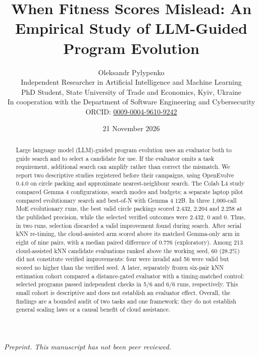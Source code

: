 \documentclass[11pt]{article}
\begin{document}
\title{When Fitness Scores Mislead: An Empirical Study of LLM-Guided Program Evolution}
\author{Oleksandr Pylypenko\\[2pt]\small Independent Researcher in Artificial Intelligence and Machine Learning\\
\small PhD Student, State University of Trade and Economics, Kyiv, Ukraine\\
\small In cooperation with the Department of Software Engineering and Cybersecurity\\[2pt]
\small ORCID: \href{https://orcid.org/0009-0004-9610-9242}{0009-0004-9610-9242}}
\date{21 November 2026}
\maketitle

\begin{center}\small\textit{Preprint. This manuscript has not been peer reviewed.}\end{center}

\begin{abstract}
Large language model (LLM)-guided program evolution uses an evaluator both to guide search and to select a candidate for use. If the evaluator omits a task requirement, additional search can amplify rather than correct the mismatch. We report two descriptive studies registered before their campaigns, using OpenEvolve 0.4.0 on circle packing and approximate nearest-neighbour search. The Colab L4 study compared Gemma 4 configurations, search modes and budgets; a separate laptop pilot compared evolutionary search and best-of-N with Gemma 4 12B. In three 1,000-call MoE evolutionary runs, the best valid circle packings scored 2.432, 2.204 and 2.258 at the published precision, while the selected verified outcomes were 2.432, 0 and 0. Thus, in two runs, selection discarded a valid improvement found during search. After serial kNN re-timing, the cloud-assisted arm scored above its matched Gemma-only arm in eight of nine pairs, with a median paired difference of 0.776 (exploratory). Among 213 cloud-assisted kNN candidate evaluations ranked above the working seed, 60 (28.2\%) did not constitute verified improvements: four were invalid and 56 were valid but scored no higher than the verified seed. A later, separately frozen six-pair kNN estimation cohort compared a distance-gated evaluator with a timing-matched control: selected programs passed independent checks in 5/6 and 6/6 runs, respectively. This small cohort is descriptive and does not establish an evaluator effect. Overall, the findings are a bounded audit of two tasks and one framework; they do not establish general scaling laws or a causal benefit of cloud assistance.
\end{abstract}
\end{document}
